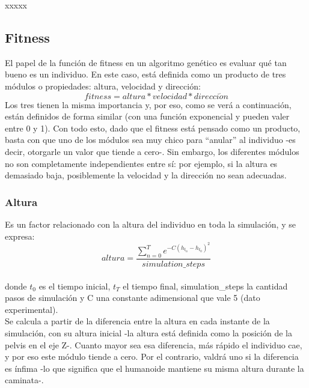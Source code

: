 \documentclass{article}
\begin{document}
xxxxx

\subsection{Fitness}

El papel de la funci\'on de fitness en un algoritmo gen\'etico es evaluar qu\'e tan bueno es un individuo. En este caso, est\'a definida como un producto de tres m\'odulos o propiedades: altura, velocidad y direcci\'on:
\begin{equation}
  fitness = altura * velocidad * direcci\acute{o}n
\end{equation}
Los tres tienen la misma importancia y, por eso, como se ver\'a a continuaci\'on, est\'an definidos de forma similar (con una funci\'on exponencial y pueden valer entre 0 y 1). Con todo esto, dado que el fitness est\'a pensado como un producto, basta con que uno de los m\'odulos sea muy chico para  ``anular'' al individuo -es decir, otorgarle un valor que tiende a cero-. Sin embargo, los diferentes m\'odulos no son completamente independientes entre s\'i: por ejemplo, si la altura es demasiado baja, posiblemente la velocidad y la direcci\'on no sean adecuadas. \\

\subsubsection{Altura}
\label{altura}
Es un factor relacionado con la altura del individuo en toda la simulaci\'on, y se expresa:\\
\begin{equation}
  altura = \frac{\sum_{n=0}^{T} {e^{-C( h_{t_{n}} - h_{t_{0}} )^2  }}}{simulation\_steps}
\end{equation}
\\ donde $t_{0}$ es el tiempo inicial, $t_{T}$ el tiempo final, simulation\_steps la cantidad pasos de simulaci\'on y C una constante adimensional que vale 5 (dato experimental).
\\
Se calcula a partir de la diferencia entre la altura en cada instante de la simulaci\'on, con su altura inicial -la altura est\'a definida como la posici\'on de la pelvis en el eje Z-. Cuanto mayor sea esa diferencia, m\'as r\'apido el individuo cae, y por eso este m\'odulo tiende a cero. Por el contrario, valdr\'a uno si la diferencia es \'infima -lo que significa que el humanoide mantiene su misma altura durante la caminata-.\\
\end{document}
